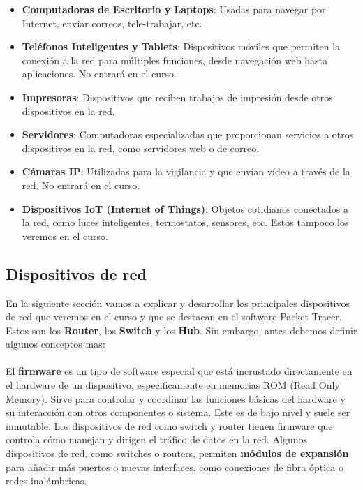 \documentclass{article}
\begin{document}
\begin{itemize}
    \item \textbf{Computadoras de Escritorio y Laptops}: Usadas para navegar por Internet, enviar correos, tele-trabajar, etc.
    \item \textbf{Teléfonos Inteligentes y Tablets}: Dispositivos móviles que permiten la conexión a la red para múltiples funciones, desde navegación web hasta aplicaciones. No entrará en el curso.
    \item \textbf{Impresoras}: Dispositivos que reciben trabajos de impresión desde otros dispositivos en la red.
    \item \textbf{Servidores}: Computadoras especializadas que proporcionan servicios a otros dispositivos en la red, como servidores web o de correo.
    \item \textbf{Cámaras IP}: Utilizadas para la vigilancia y que envían vídeo a través de la red. No entrará en el curso.
    \item \textbf{Dispositivos IoT (Internet of Things)}: Objetos cotidianos conectados a la red, como luces inteligentes, termostatos, sensores, etc. Estos tampoco los veremos en el curso.
\end{itemize}
    

\subsection{Dispositivos de red}
En la siguiente sección vamos a explicar y desarrollar los principales dispositivos de red que veremos en el curso y que se destacan en el software Packet Tracer. Estos son los \textbf{Router}, los \textbf{Switch} y los \textbf{Hub}. Sin embargo, antes debemos definir algunos conceptos mas:
\\\\
{\setlength{\parindent}{1pt} El \textbf{firmware} es un tipo de software especial que está incrustado directamente en el hardware de un dispositivo, especificamente en memorias ROM (Read Only Memory). Sirve para controlar y coordinar las funciones básicas del hardware y su interacción con otros componentes o sistema. Este es de bajo nivel y suele ser inmutable. Los dispositivos de red como switch y router tienen firmware que controla cómo manejan y dirigen el tráfico de datos en la red. Algunos dispositivos de red, como switches o routers, permiten \textbf{módulos de expansión} para añadir más puertos o nuevas interfaces, como conexiones de fibra óptica o redes inalámbricas. }
\end{document}
